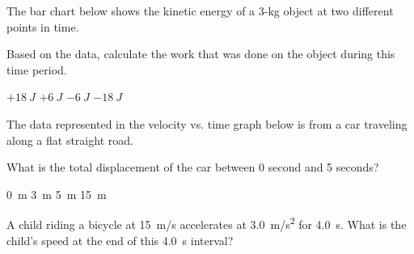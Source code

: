 \documentclass[]{exam}
\begin{document}
\begin{questions}
\question
The bar chart below shows the kinetic energy of a 3-kg object at two different points in time.

\begin{center}
\end{center}

Based on the data, calculate the work that was done on the object during this time period.

\begin{randomizechoices}
    \choice $+\SI{18}{J}$
    \choice $+\SI{6}{J}$
    \correctchoice $-\SI{6}{J}$
    \choice $-\SI{18}{J}$
\end{randomizechoices}

\question
The data represented in the velocity vs. time graph below is from a car traveling along a flat straight road.

\begin{center}
\end{center}

What is the total displacement of the car between 0 second and 5 seconds?

\begin{randomizechoices}
    \choice \SI{0}{m}
    \choice \SI{3}{m}
    \choice \SI{5}{m}
    \correctchoice \SI{15}{m}
\end{randomizechoices}

\question
A child riding a bicycle at \SI{15}{m/s} accelerates at \SI{3.0}{m/s^2} for \SI{4.0}{s}. What is the child's speed at the end of this \SI{4.0}{s} interval?


\end{questions}
\end{document}
